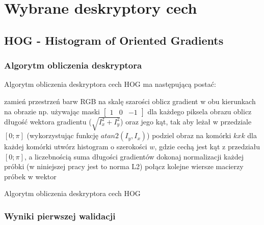 \chapter{Wybrane deskryptory cech}
\label{cha:deskryptory}

\section{HOG - Histogram of Oriented Gradients}
\label{sec:hog}

\subsection{Algorytm obliczenia deskryptora}

Algorytm obliczenia deskryptora cech HOG ma następującą postać:

\begin{algorithm}[H]
 \SetAlgoLined
 zamień przestrzeń barw RGB na skalę szarości\;
 oblicz gradient w obu kierunkach na obrazie np. używając maski  $\left[\begin{array}{ccc}1 & 0 & -1\end{array}\right]$\;
 dla każdego piksela obrazu oblicz długość wektora gradientu ($\sqrt{I_x^2 + I_y^2}$) oraz jego kąt, tak aby leżał w przedziale $[0; \pi]$ (wykorzystując funkcję $atan2(I_y, I_x)$)\;
 podziel obraz na komórki $k x k$\;
 dla każdej komórki utwórz histogram o szerokości $w$, gdzie cechą jest kąt z przedziału $[0; \pi]$, a liczebnością suma długości gradientów\;
 dokonaj normalizacji każdej próbki (w niniejszej pracy jest to norma L2)\;
 połącz kolejne wiersze macierzy próbek w wektor\;
 \;
 \caption{Algorytm obliczenia deskryptora cech HOG}
\end{algorithm}

\subsection{Wyniki pierwszej walidacji}

